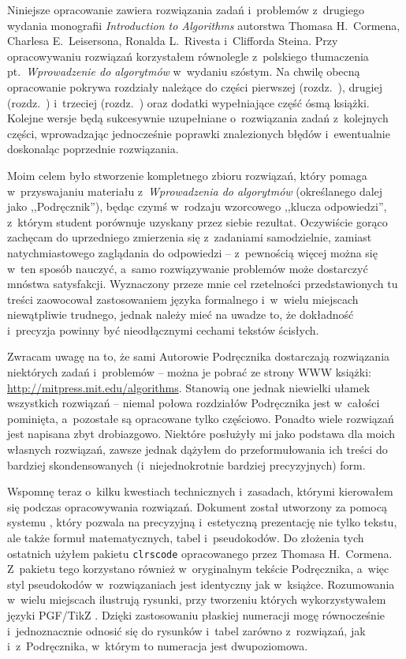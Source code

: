 
Niniejsze opracowanie zawiera rozwiązania zadań i~problemów z~drugiego wydania monografii \textsl{Introduction to Algorithms} \cite{cormen} autorstwa Thomasa H.\ Cormena, Charlesa E.\ Leisersona, Ronalda L.\ Rivesta i~Clifforda Steina.
Przy opracowywaniu rozwiązań korzystałem równolegle z~polskiego tłumaczenia pt.\ \textsl{Wprowadzenie do algorytmów} \cite{cormenpl} w~wydaniu szóstym.
Na chwilę obecną opracowanie pokrywa rozdziały należące do części pierwszej (rozdz.\ ), drugiej (rozdz.\ ) i~trzeciej (rozdz.\ ) oraz dodatki wypełniające część ósmą książki.
Kolejne wersje będą sukcesywnie uzupełniane o~rozwiązania zadań z~kolejnych części, wprowadzając jednocześnie poprawki znalezionych błędów i~ewentualnie doskonaląc poprzednie rozwiązania.

Moim celem było stworzenie kompletnego zbioru rozwiązań, który pomaga w~przyswajaniu materiału z~\textsl{Wprowadzenia do algorytmów} (określanego dalej jako ,,Podręcznik''), będąc czymś w~rodzaju wzorcowego ,,klucza odpowiedzi'', z~którym student porównuje uzyskany przez siebie rezultat.
Oczywiście gorąco zachęcam do uprzedniego zmierzenia się z~zadaniami samodzielnie, zamiast natychmiastowego zaglądania do odpowiedzi -- z~pewnością więcej można się w~ten sposób nauczyć, a~samo rozwiązywanie problemów może dostarczyć mnóstwa satysfakcji.
Wyznaczony przeze mnie cel rzetelności przedstawionych tu treści zaowocował zastosowaniem języka formalnego i~w~wielu miejscach niewątpliwie trudnego, jednak należy mieć na uwadze to, że dokładność i~precyzja powinny być nieodłącznymi cechami tekstów ścisłych.

Zwracam uwagę na to, że sami Autorowie Podręcznika dostarczają rozwiązania niektórych zadań i~problemów -- można je pobrać ze strony WWW książki: \url{http://mitpress.mit.edu/algorithms}.
Stanowią one jednak niewielki ułamek wszystkich rozwiązań -- niemal połowa rozdziałów Podręcznika jest w~całości pominięta, a~pozostałe są opracowane tylko częściowo.
Ponadto wiele rozwiązań jest napisana zbyt drobiazgowo.
Niektóre posłużyły mi jako podstawa dla moich własnych rozwiązań, zawsze jednak dążyłem do przeformułowania ich treści do bardziej skondensowanych (i~niejednokrotnie bardziej precyzyjnych) form.

Wspomnę teraz o~kilku kwestiach technicznych i~zasadach, którymi kierowałem się podczas opracowywania rozwiązań.
Dokument został utworzony za pomocą systemu \LaTeXe, który pozwala na precyzyjną i~estetyczną prezentację nie tylko tekstu, ale także formuł matematycznych, tabel i~pseudokodów.
Do złożenia tych ostatnich użyłem pakietu \texttt{clrscode} opracowanego przez Thomasa H.\ Cormena.
Z~pakietu tego korzystano również w~oryginalnym tekście Podręcznika, a~więc styl pseudokodów w~rozwiązaniach jest identyczny jak w~książce.
Rozumowania w~wielu miejscach ilustrują rysunki, przy tworzeniu których wykorzystywałem języki PGF/TikZ \cite{pgfmanual}.
Dzięki zastosowaniu płaskiej numeracji mogę równocześnie i~jednoznacznie odnosić się do rysunków i~tabel zarówno z~rozwiązań, jak i~z~Podręcznika, w~którym to numeracja jest dwupoziomowa.

